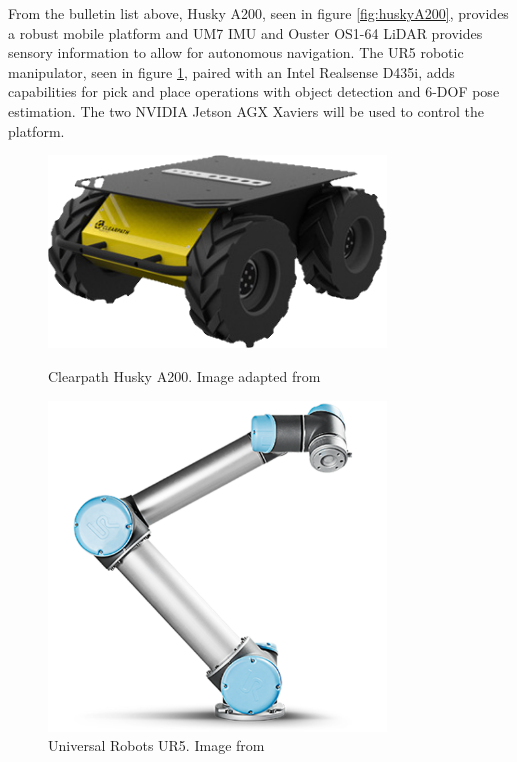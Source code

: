 From the bulletin list above, Husky A200, seen in figure \ref{fig:huskyA200}, provides a robust mobile platform and UM7 IMU and Ouster OS1-64 LiDAR provides sensory information to allow for autonomous navigation. The UR5 robotic manipulator, seen in figure \ref{fig:ur5}, paired with an Intel Realsense D435i, adds capabilities for pick and place operations with object detection and 6-DOF pose estimation. The two NVIDIA Jetson AGX Xaviers will be used to control the platform.

\begin{figure}[H]
  \centering
  \begin{minipage}[b]{0.49\textwidth}
        \centering
        \includegraphics[width = 0.8\textwidth]{Figures/huskyA200.png}
        \caption{Clearpath Husky A200. Image adapted from \cite{clearpath_husky_website}}
        \label{fig:huskyA200}
  \end{minipage}
  \hfill
  \begin{minipage}[b]{0.49\textwidth}
    \centering
    \includegraphics[width = 0.8\textwidth]{Figures/ur5.png}
    \caption{Universal Robots UR5. Image from \cite{ur5_img}}
    \label{fig:ur5}
  \end{minipage}
\end{figure}

